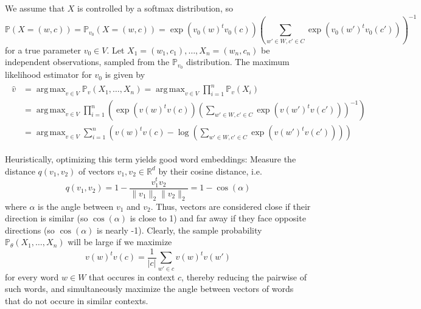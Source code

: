 \documentclass{amsart}
\theoremstyle{plain}
\theoremstyle{definition}
\newcommand{\R}{\mathbb{R}}
\renewcommand{\P}{\mathbb{P}}
\DeclareMathOperator*{\argmax}{arg\,max}
\begin{document}
We assume that $X$ is controlled by a softmax distribution, so
\begin{equation*}
  \P(X = (w, c)) = \P_{v_0}(X = (w, c)) = \exp \left(v_0(w)^t v_0(c)\right) \left( \sum_{w' \in W, c' \in C} \exp \left( v_0(w')^t v_0(c') \right) \right)^{-1}
\end{equation*}
for a true parameter $v_0 \in V$.
Let $X_1 = (w_1, c_1), \dots, X_n = (w_n, c_n)$ be independent observations, sampled from the $\P_{v_0}$ distribution.
The maximum likelihood estimator for $v_0$ is given by
\begin{align}
  \begin{split}
  \label{eq:def-ml-estimator}
  \hat v &= \argmax_{v \in V} \P_v(X_1, \dots, X_n) = \argmax_{v \in V} \prod_{i = 1}^n \P_v(X_i) \\
             & = \argmax_{v \in V} \prod_{i = 1}^n \left( \exp \left(v(w)^t v(c) \right) \left(\sum_{w' \in W, c' \in C} \exp \left(v(w')^t v(c')\right) \right)^{-1} \right) \\
             & = \argmax_{v \in V} \sum_{i = 1}^n \left( v(w)^t v(c) - \log \left(\sum_{w' \in W, c' \in C} \exp \left(v(w')^t v(c')\right) \right) \right)
  \end{split}
\end{align}

Heuristically, optimizing this term yields good word embeddings:
Measure the distance $q(v_1, v_2)$ of vectors $v_1, v_2 \in \R^d$ by their cosine distance, i.e.
\begin{equation*}
  q(v_1, v_2) = 1 - \frac{v_1^t v_2}{\lVert v_1 \rVert_2 \lVert v_2 \rVert_2} = 1 - \cos(\alpha)
\end{equation*}
where $\alpha$ is the angle between $v_1$ and $v_2$.
Thus, vectors are considered close if their direction is similar (so $\cos(\alpha)$ is close to 1) and far away if they face opposite directions (so $\cos(\alpha)$ is nearly -1).
Clearly, the sample probability $\P_\theta(X_1, \dots, X_n)$ will be large if we maximize 
\begin{equation*}
  v(w)^t v(c) = \frac{1}{|c|} \sum_{w' \in c} v(w)^t v(w')
\end{equation*}
for every word $w \in W$ that occures in context $c$, thereby reducing the pairwise of such words, and simultaneously maximize the angle between vectors of words that do not occure in similar contexts.
\end{document}
